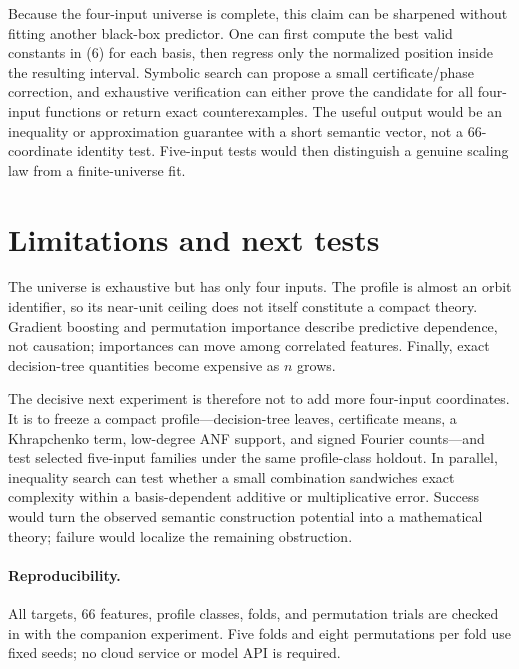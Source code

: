 \documentclass[10pt]{article}
\theoremstyle{definition}
\begin{document}
Because the four-input universe is complete, this claim can be sharpened
without fitting another black-box predictor.  One can first compute the best
valid constants in (6) for each basis, then regress only the normalized
position inside the resulting interval.  Symbolic search can propose a small
certificate/phase correction, and exhaustive verification can either prove
the candidate for all four-input functions or return exact counterexamples.
The useful output would be an inequality or approximation guarantee with a
short semantic vector, not a 66-coordinate identity test.  Five-input tests
would then distinguish a genuine scaling law from a finite-universe fit.

\section{Limitations and next tests}

The universe is exhaustive but has only four inputs.  The profile is almost an
orbit identifier, so its near-unit ceiling does not itself constitute a compact
theory.  Gradient boosting and permutation importance describe predictive
dependence, not causation; importances can move among correlated features.
Finally, exact decision-tree quantities become expensive as $n$ grows.

The decisive next experiment is therefore not to add more four-input
coordinates.  It is to freeze a compact profile---decision-tree leaves,
certificate means, a Khrapchenko term, low-degree ANF support, and signed
Fourier counts---and test selected five-input families under the same
profile-class holdout.  In parallel, inequality search can test whether a
small combination sandwiches exact complexity within a basis-dependent
additive or multiplicative error.  Success would turn the observed semantic
construction potential into a mathematical theory; failure would localize the
remaining obstruction.

\paragraph{Reproducibility.}
All targets, 66 features, profile classes, folds, and permutation trials are
checked in with the companion experiment.  Five folds and eight permutations
per fold use fixed seeds; no cloud service or model API is required.
\end{document}
